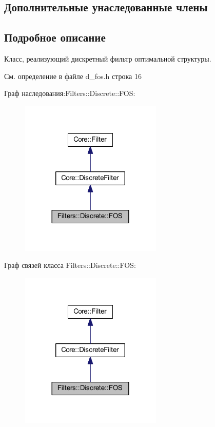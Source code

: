 \subsection*{Дополнительные унаследованные члены}


\subsection{Подробное описание}
Класс, реализующий дискретный фильтр оптимальной структуры. 

См. определение в файле d\+\_\+fos.\+h строка 16



Граф наследования\+:Filters\+:\+:Discrete\+:\+:F\+OS\+:
\nopagebreak
\begin{figure}[H]
\begin{center}
\leavevmode
\includegraphics[width=192pt]{class_filters_1_1_discrete_1_1_f_o_s__inherit__graph}
\end{center}
\end{figure}


Граф связей класса Filters\+:\+:Discrete\+:\+:F\+OS\+:
\nopagebreak
\begin{figure}[H]
\begin{center}
\leavevmode
\includegraphics[width=192pt]{class_filters_1_1_discrete_1_1_f_o_s__coll__graph}
\end{center}
\end{figure}


